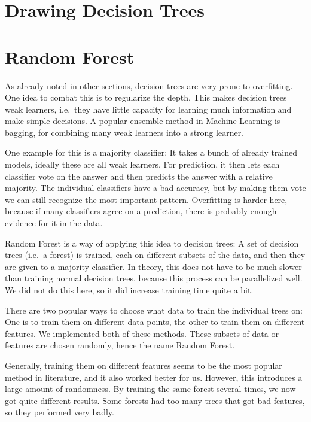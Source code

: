 \documentclass[a4paper]{article}
\begin{document}
\section{Drawing Decision Trees}


\section{Random Forest}

As already noted in other sections, decision trees are very prone to overfitting. One idea to combat this is to regularize the depth. This makes decision trees weak learners, i.e.\ they have little capacity for learning much information and make simple decisions. A popular ensemble method in Machine Learning is bagging, for combining many weak learners into a strong learner.

One example for this is a majority classifier: It takes a bunch of already trained models, ideally these are all weak learners. For prediction, it then lets each classifier vote on the answer and then predicts the answer with a relative majority. The individual classifiers have a bad accuracy, but by making them vote we can still recognize the most important pattern. Overfitting is harder here, because if many classifiers agree on a prediction, there is probably enough evidence for it in the data.

Random Forest is a way of applying this idea to decision trees: A set of decision trees (i.e.\ a forest) is trained, each on different subsets of the data, and then they are given to a majority classifier. In theory, this does not have to be much slower than training normal decision trees, because this process can be parallelized well. We did not do this here, so it did increase training time quite a bit.

There are two popular ways to choose what data to train the individual trees on: One is to train them on different data points, the other to train them on different features. We implemented both of these methods. These subsets of data or features are chosen randomly, hence the name Random Forest.

Generally, training them on different features seems to be the most popular method in literature, and it also worked better for us. However, this introduces a large amount of randomness. By training the same forest several times, we now got quite different results. Some forests had too many trees that got bad features, so they performed very badly.
\end{document}
